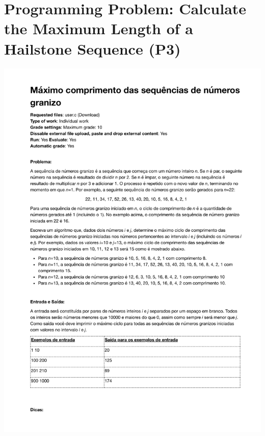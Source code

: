 \section{Programming Problem: Calculate the Maximum Length of a Hailstone Sequence (P3)}
\label{annex:second-study-p3}
\includegraphics[page=1,width=1\textwidth]{images/annex/second-study-p3.pdf}

\newpage
